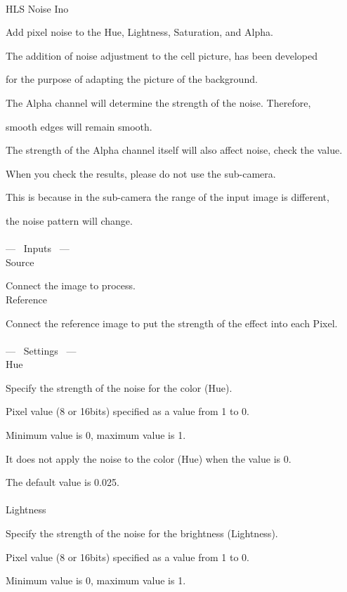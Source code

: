 \documentclass[a4paper,12pt]{article}
\begin{document}
\thispagestyle{empty}

\Large
\noindent \\
HLS Noise Ino\medskip
\par
\normalsize
Add pixel noise to the Hue, Lightness, Saturation, and Alpha.\par
The addition of noise adjustment to the cell picture, has been developed\par
for the purpose of adapting the picture of the background.\\
\par
The Alpha channel will determine the strength of the noise. Therefore,\par
smooth edges will remain smooth.\par
The strength of the Alpha channel itself will also affect noise, check the value.\\
\par
When you check the results, please do not use the sub-camera.\par
This is because in the sub-camera the range of the input image is different,\par
the noise pattern will change.\\
\\
--- \ Inputs \ ---\\
Source\par
Connect the image to process.\\
Reference\par
Connect the reference image to put the strength of the effect into each Pixel.\\
\\
--- \ Settings \ ---\\
Hue\par
Specify the strength of the noise for the color (Hue).\par
Pixel value (8 or 16bits) specified as a value from 1 to 0.\par
Minimum value is 0, maximum value is 1.\par
It does not apply the noise to the color (Hue) when the value is 0.\par
The default value is 0.025.\\
\\
Lightness\par
Specify the strength of the noise for the brightness (Lightness).\par
Pixel value (8 or 16bits) specified as a value from 1 to 0.\par
Minimum value is 0, maximum value is 1.\par
\end{document}
